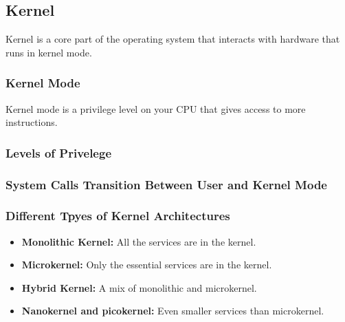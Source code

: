 \documentclass[twoside]{article}
\begin{document}
\subsection{Kernel}
\begin{definition}
    Kernel is a core part of the operating system that interacts with hardware that runs in kernel mode. 
\end{definition}

\subsubsection{Kernel Mode}
\begin{definition}
    Kernel mode is a privilege level on your CPU that gives access to more instructions.
\end{definition}

\subsubsection{Levels of Privelege}
\begin{definition}
\end{definition}

\subsubsection{System Calls Transition Between User and Kernel Mode}
\begin{definition}
\end{definition}

\subsubsection{Different Tpyes of Kernel Architectures}
\begin{definition}
    \begin{itemize}
        \item \textbf{Monolithic Kernel:} All the services are in the kernel.
        \item \textbf{Microkernel:} Only the essential services are in the kernel.
        \item \textbf{Hybrid Kernel:} A mix of monolithic and microkernel.
        \item \textbf{Nanokernel and picokernel:} Even smaller services than microkernel.
    \end{itemize}
\end{definition}
\end{document}
